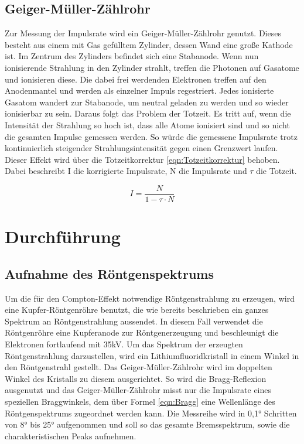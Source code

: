 \documentclass[titlepage = firstcover]{scrartcl}
\begin{document}
        \subsection{Geiger-Müller-Zählrohr} \label{Geiger}
        Zur Messung der Impulsrate wird ein Geiger-Müller-Zählrohr genutzt. Dieses besteht aus einem mit Gas gefülltem Zylinder, dessen Wand eine große
        Kathode ist. Im Zentrum des Zylinders befindet sich eine Stabanode. Wenn nun ionisierende Strahlung in den Zylinder strahlt, treffen die Photonen
        auf Gasatome und ionisieren diese. Die dabei frei werdenden Elektronen treffen auf den Anodenmantel und werden als einzelner Impuls regestriert. Jedes
        ionisierte Gasatom wandert zur Stabanode, um neutral geladen zu werden und so wieder ionisierbar zu sein. Daraus folgt das Problem der Totzeit. Es 
        tritt auf, wenn die Intensität der Strahlung so hoch ist, dass alle Atome ionisiert sind und so nicht die gesamten Impulse gemessen werden. So würde 
        die gemessene Impulsrate trotz kontinuierlich steigender Strahlungsintensität gegen einen Grenzwert laufen. Dieser Effekt wird über die 
        Totzeitkorrektur \ref{eqn:Totzeitkorrektur} behoben. Dabei beschreibt I die korrigierte Impulsrate, N die Impulsrate und $\tau$ die Totzeit.
        
        \begin{equation}
            I = \frac{N}{1-\tau \cdot N}
            \label{eqn:Totzeitkorrektur}
        \end{equation}
        

    \section{Durchführung}
        \subsection{Aufnahme des Röntgenspektrums}
        Um die für den Compton-Effekt notwendige Röntgenstrahlung zu erzeugen, wird eine Kupfer-Röntgenröhre benutzt, die wie bereits beschrieben ein ganzes 
        Spektrum an Röntgenstrahlung aussendet. In diesem Fall verwendet die Röntgenröhre eine Kupferanode zur Röntgenerzeugung und beschleunigt die Elektronen
        fortlaufend mit 35kV. Um das Spektrum der 
        erzeugten Röntgenstrahlung darzustellen, wird ein Lithiumfluoridkristall in einem Winkel in den Röntgenstrahl gestellt. Das Geiger-Müller-Zählrohr
        wird im doppelten Winkel des Kristalls zu diesem ausgerichtet. So wird die Bragg-Reflexion ausgenutzt und das Geiger-Müller-Zählrohr misst nur die
        Impulsrate eines speziellen Braggwinkels, dem über Formel \ref{eqn:Bragg} eine Wellenlänge des Röntgenspektrums zugeordnet werden kann. Die Messreihe
        wird in 0,1° Schritten von 8° bis 25° aufgenommen und soll so das gesamte Bremsspektrum, sowie die charakteristischen Peaks aufnehmen.
        
\end{document}
